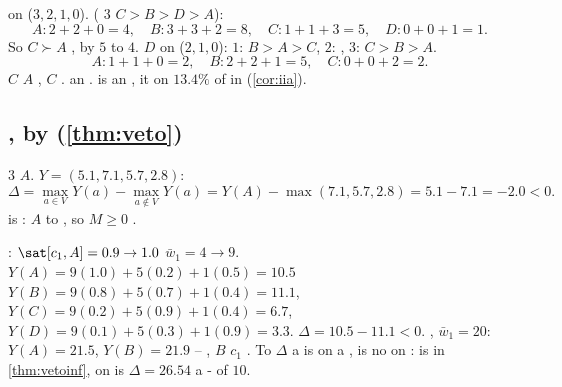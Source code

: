    on   ($3,2,1,0$).     
( $3$  $C\!>\!B\!>\!D\!>\!A$):
\[
A: 2+2+0=4,\quad B: 3+3+2=8,\quad C: 1+1+3=5,\quad D: 0+0+1=1 .
\]
So $C \succ A$ , by $5$ to $4$.   $D$   on 
 ($2,1,0$):  $1$: $B\!>\!A\!>\!C$,  $2$: , 
$3$: $C\!>\!B\!>\!A$.
\[
A: 1+1+0=2,\quad B: 2+2+1=5,\quad C: 0+0+2=2 .
\]
 $C$  $A$  \emph{},   $C$ .  an 
        .  is an 
,  it  on $13.4\%$ of  in   
(\cref{cor:iia}).

\subsection{  , by  (\cref{thm:veto})}

 $3$  $A$.  $Y=(5.1,7.1,5.7,2.8)$:
\[
\Delta = \max_{a\in V}Y(a) - \max_{a\notin V}Y(a) = Y(A) - \max(7.1,5.7,2.8) = 5.1-7.1 = -2.0 < 0 .
\]
  is \emph{ }: $A$    to  , so  $M\ge 0$
  .

   :  $\sat[c_1,A]=0.9 \to 1.0$  $\bar w_1 = 4 \to 9$.
 $Y(A) = 9(1.0)+5(0.2)+1(0.5) = 10.5$ 
$Y(B) = 9(0.8)+5(0.7)+1(0.4)=11.1$, $Y(C)=9(0.2)+5(0.9)+1(0.4)=6.7$,
$Y(D)=9(0.1)+5(0.3)+1(0.9)=3.3$.  $\Delta = 10.5-11.1 <0$.   ,
$\bar w_1 = 20$: $Y(A)=21.5$, $Y(B)=21.9$ --      ,
 $B$   $c_1$ . To  $\Delta$    a 
  is \emph{}  on a   ,  
is no  on  :  is    in
\cref{thm:vetoinf},  on       is
$\Delta = 26.54$  a -  of $10$.


